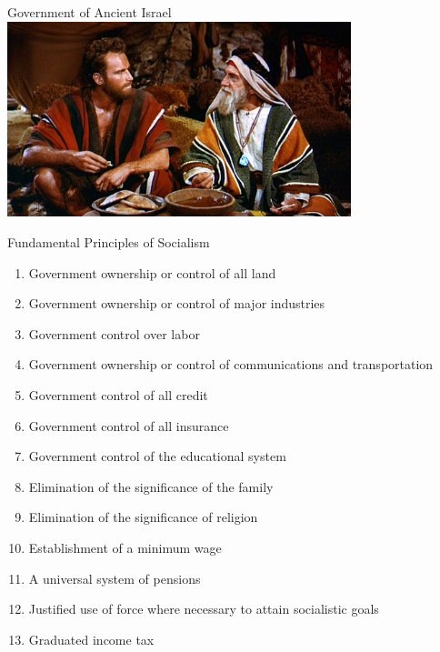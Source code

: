 \begin{frame}{Government of Ancient Israel}
    \centering
    \includegraphics[width=0.75\textwidth]{img/moses.jpg} \\
\end{frame}

\begin{frame}{Fundamental Principles of Socialism}
    \begin{enumerate}
        \item Government ownership or control of all land
        \item Government ownership or control of major industries
        \item Government control over labor
        \item Government ownership or control of communications and transportation
        \item Government control of all credit
        \item Government control of all insurance
        \item Government control of the educational system
        \item Elimination of the significance of the family
        \item Elimination of the significance of religion
        \item Establishment of a minimum wage
        \item A universal system of pensions
        \item Justified use of force where necessary to attain socialistic goals
        \item Graduated income tax
    \end{enumerate}
\end{frame}

